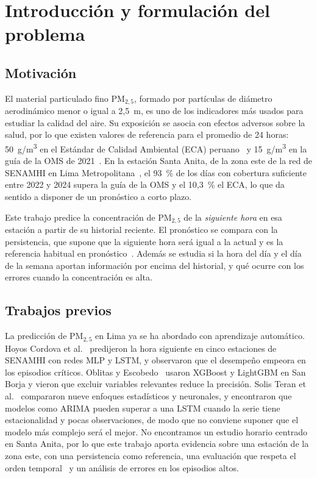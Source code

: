 \section{Introducción y formulación del problema}
\label{sec:intro}

\subsection{Motivación}
El material particulado fino PM$_{2{,}5}$, formado por partículas de diámetro aerodinámico menor o igual a 2,5~\textmu m, es uno de los indicadores más usados para estudiar la calidad del aire. Su exposición se asocia con efectos adversos sobre la salud, por lo que existen valores de referencia para el promedio de 24 horas: 50~\textmu g/m\textsuperscript{3} en el Estándar de Calidad Ambiental (ECA) peruano~\cite{minam_eca_2017} y 15~\textmu g/m\textsuperscript{3} en la guía de la OMS de 2021~\cite{who_aqg_2021}. En la estación Santa Anita, de la zona este de la red de SENAMHI en Lima Metropolitana~\cite{senamhi_vigilancia_2021}, el 93~\% de los días con cobertura suficiente entre 2022 y 2024 supera la guía de la OMS y el 10,3~\% el ECA, lo que da sentido a disponer de un pronóstico a corto plazo.

Este trabajo predice la concentración de PM$_{2{,}5}$ de la \emph{siguiente hora} en esa estación a partir de su historial reciente. El pronóstico se compara con la persistencia, que supone que la siguiente hora será igual a la actual y es la referencia habitual en pronóstico~\cite{hyndman2021fpp3}. Además se estudia si la hora del día y el día de la semana aportan información por encima del historial, y qué ocurre con los errores cuando la concentración es alta.

\subsection{Trabajos previos}
La predicción de PM$_{2{,}5}$ en Lima ya se ha abordado con aprendizaje automático. Hoyos Cordova et al.~\cite{hoyos2021} predijeron la hora siguiente en cinco estaciones de SENAMHI con redes MLP y LSTM, y observaron que el desempeño empeora en los episodios críticos. Oblitas y Escobedo~\cite{oblitas2024xgboost} usaron XGBoost y LightGBM en San Borja y vieron que excluir variables relevantes reduce la precisión. Solis Teran et al.~\cite{solis2025} compararon nueve enfoques estadísticos y neuronales, y encontraron que modelos como ARIMA pueden superar a una LSTM cuando la serie tiene estacionalidad y pocas observaciones, de modo que no conviene suponer que el modelo más complejo será el mejor. No encontramos un estudio horario centrado en Santa Anita, por lo que este trabajo aporta evidencia sobre una estación de la zona este, con una persistencia como referencia, una evaluación que respeta el orden temporal~\cite{bergmeir2012} y un análisis de errores en los episodios altos.

